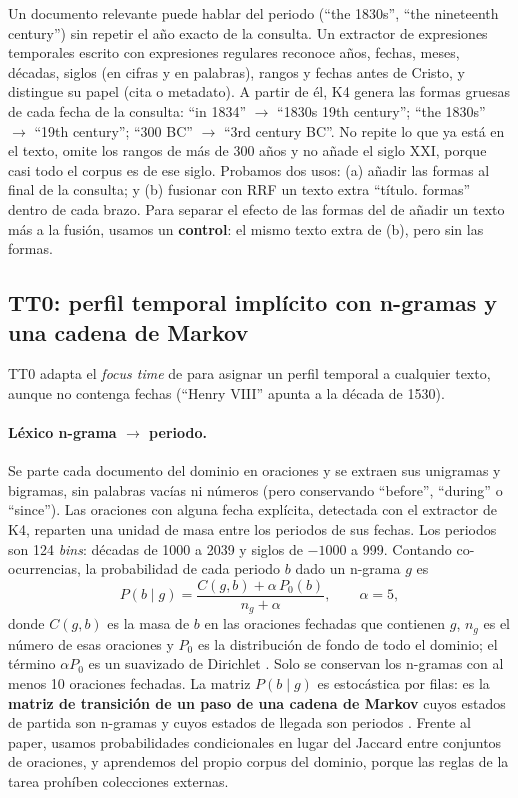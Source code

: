 \documentclass[11pt,a4paper]{article}
\begin{document}
Un documento relevante puede hablar del periodo (``the 1830s'', ``the nineteenth century'') sin repetir el año exacto de la consulta. Un extractor de expresiones temporales escrito con expresiones regulares reconoce años, fechas, meses, décadas, siglos (en cifras y en palabras), rangos y fechas antes de Cristo, y distingue su papel (cita o metadato). A partir de él, K4 genera las formas gruesas de cada fecha de la consulta: ``in 1834'' $\rightarrow$ ``1830s 19th century''; ``the 1830s'' $\rightarrow$ ``19th century''; ``300 BC'' $\rightarrow$ ``3rd century BC''. No repite lo que ya está en el texto, omite los rangos de más de 300 años y no añade el siglo XXI, porque casi todo el corpus es de ese siglo. Probamos dos usos: (a) añadir las formas al final de la consulta; y (b) fusionar con RRF un texto extra ``título. formas'' dentro de cada brazo. Para separar el efecto de las formas del de añadir un texto más a la fusión, usamos un \textbf{control}: el mismo texto extra de (b), pero sin las formas.

\subsection{TT0: perfil temporal implícito con n-gramas y una cadena de Markov}
\label{sec:tt0}

TT0 adapta el \emph{focus time} de \citet{jatowt2013focus} para asignar un perfil temporal a cualquier texto, aunque no contenga fechas (``Henry VIII'' apunta a la década de 1530).

\paragraph{Léxico n-grama $\rightarrow$ periodo.} Se parte cada documento del dominio en oraciones y se extraen sus unigramas y bigramas, sin palabras vacías ni números (pero conservando ``before'', ``during'' o ``since''). Las oraciones con alguna fecha explícita, detectada con el extractor de K4, reparten una unidad de masa entre los periodos de sus fechas. Los periodos son 124 \emph{bins}: décadas de 1000 a 2039 y siglos de $-1000$ a 999. Contando co-ocurrencias, la probabilidad de cada periodo $b$ dado un n-grama $g$ es
\begin{equation}
P(b \mid g) = \frac{C(g,b) + \alpha\, P_0(b)}{n_g + \alpha}, \qquad \alpha = 5,
\end{equation}
donde $C(g,b)$ es la masa de $b$ en las oraciones fechadas que contienen $g$, $n_g$ es el número de esas oraciones y $P_0$ es la distribución de fondo de todo el dominio; el término $\alpha P_0$ es un suavizado de Dirichlet \citep{zhai2004study}. Solo se conservan los n-gramas con al menos 10 oraciones fechadas. La matriz $P(b \mid g)$ es estocástica por filas: es la \textbf{matriz de transición de un paso de una cadena de Markov} cuyos estados de partida son n-gramas y cuyos estados de llegada son periodos \citep{jurafsky2025speech}. Frente al paper, usamos probabilidades condicionales en lugar del Jaccard entre conjuntos de oraciones, y aprendemos del propio corpus del dominio, porque las reglas de la tarea prohíben colecciones externas.
\end{document}
